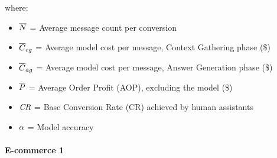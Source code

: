 where:
\begin{itemize}
    \item $\overline{N}$ = Average message count per conversion
    \item $\overline{C}_{cg}$ = Average model cost per message, Context Gathering phase (\$)
    \item $\overline{C}_{ag}$ = Average model cost per message, Answer Generation phase (\$)
    \item $\overline{P}$ = Average Order Profit (AOP), excluding the model (\$)
    \item $\textit{CR}$ = Base Conversion Rate (CR) achieved by human assistants
    \item $\alpha$ = Model accuracy
\end{itemize}

\paragraph*{E-commerce 1}

